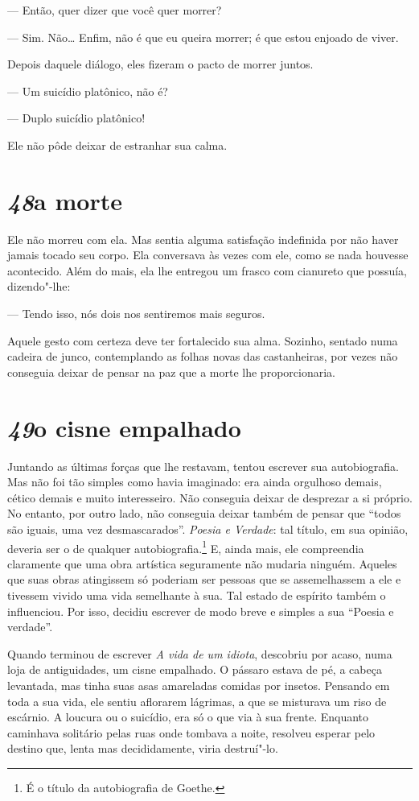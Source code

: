 --- Então, quer dizer que você quer morrer?

--- Sim. Não\ldots{} Enfim, não é que eu queira morrer; é que estou enjoado de
viver.

Depois daquele diálogo, eles fizeram o pacto de morrer juntos.

--- Um suicídio platônico, não é?

--- Duplo suicídio platônico!

Ele não pôde deixar de estranhar sua calma.

\section*{\textit{48}\es a morte}

Ele não morreu com ela. Mas sentia alguma satisfação indefinida por não
haver jamais tocado seu corpo. Ela conversava às vezes com ele, como se
nada houvesse acontecido. Além do mais, ela lhe entregou um frasco com
cianureto que possuía, dizendo"-lhe:

--- Tendo isso, nós dois nos sentiremos mais seguros.

Aquele gesto com certeza deve ter fortalecido sua alma. Sozinho, sentado
numa cadeira de junco, contemplando as folhas novas das castanheiras,
por vezes não conseguia deixar de pensar na paz que a morte lhe
proporcionaria.

\section*{\textit{49}\es o cisne empalhado}

Juntando as últimas forças que lhe restavam, tentou escrever sua
autobiografia. Mas não foi tão simples como havia imaginado: era ainda
orgulhoso demais, cético demais e muito interesseiro. Não conseguia
deixar de desprezar a si próprio. No entanto, por outro lado, não
conseguia deixar também de pensar que ``todos são iguais, uma vez
desmascarados''. \textit{Poesia e Verdade}: tal título, em sua opinião,
deveria ser o de qualquer autobiografia.\footnote{ É o título da
autobiografia de Goethe.} E, ainda mais, ele compreendia claramente
que uma obra artística seguramente não mudaria ninguém. Aqueles que
suas obras atingissem só poderiam ser pessoas que se assemelhassem a
ele e tivessem vivido uma vida semelhante à sua. Tal estado de espírito
também o influenciou. Por isso, decidiu escrever de modo breve e
simples a sua ``Poesia e verdade''.

Quando terminou de escrever \textit{A vida de um idiota},
descobriu por acaso, numa loja de antiguidades, um cisne empalhado. O
pássaro estava de pé, a cabeça levantada, mas tinha suas asas
amareladas comidas por insetos. Pensando em toda a sua vida, ele sentiu
aflorarem lágrimas, a que se misturava um riso de escárnio. A loucura
ou o suicídio, era só o que via à sua frente. Enquanto caminhava
solitário pelas ruas onde tombava a noite, resolveu esperar pelo
destino que, lenta mas decididamente, viria destruí"-lo.

